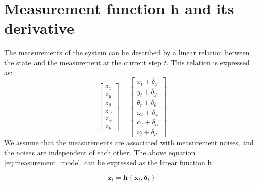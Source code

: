 \documentclass[12pt, a4paper]{article}
\begin{document}
\section{Measurement function $\bm{h}$ and its derivative}
The measurements of the system can be described by a linear relation between the state and the measurement at the current step $t$. This relation is expressed as:
\begin{equation}
  \label{eq:measurement_model}
  \begin{bmatrix}
    z_{x}\\
    z_{y}\\
    z_{\theta}\\
    z_{\omega}\\
    z_{\alpha}\\
    z_{\nu}
  \end{bmatrix}=
  \begin{bmatrix}
    x_{t} + \delta_{x}\\
    y_{t} + \delta_{y}\\
    \theta_{t} + \delta_{\theta}\\
    \omega_{t} + \delta_{\omega}\\
    \alpha_{t} + \delta_{\alpha}\\
    \nu_{t} + \delta_{\nu}
  \end{bmatrix}
\end{equation}
We assume that the measurements are associated with measurement noises, and the noises are independent of each other. The above equation \eqref{eq:measurement_model} can be expressed as the linear function $\bm{h}$:

\[
  \bm{z}_{t} = \bm{h}(\bm{x}_{t}, \bm{\delta}_{t})
\]
\end{document}
